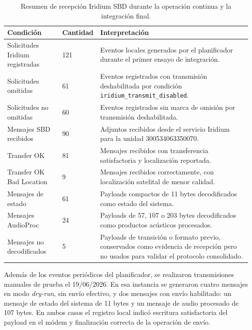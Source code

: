 \begin{table}[htpb]
\centering
\small
\caption{Resumen de recepción Iridium SBD durante la operación continua y la integración final.}
\label{tab:resumen_iridium_larga_duracion}

\begin{tabularx}{\textwidth}{p{} p{} X}
\toprule
\textbf{Condición} & \textbf{Cantidad} & \textbf{Interpretación} \\
\midrule
Solicitudes Iridium registradas & 121 & Eventos locales generados por el planificador durante el primer ensayo de integración. \\
Solicitudes omitidas & 61 & Eventos registrados con transmisión deshabilitada por condición \texttt{iridium\_transmit\_disabled}. \\
Solicitudes no omitidas & 60 & Eventos registrados sin marca de omisión por transmisión deshabilitada. \\
Mensajes SBD recibidos & 90 & Adjuntos recibidos desde el servicio Iridium para la unidad 300534063350070. \\
Transfer OK & 81 & Mensajes recibidos con transferencia satisfactoria y localización reportada. \\
Transfer OK Bad Location & 9 & Mensajes recibidos correctamente, con localización satelital de menor calidad. \\
Mensajes de estado & 61 & Payloads compactos de 11 bytes decodificados como estado del sistema. \\
Mensajes AudioProc & 24 & Payloads de 57, 107 o 203 bytes decodificados como productos acústicos procesados. \\
Mensajes no decodificados & 5 & Payloads de transición o formato previo, conservados como evidencia de recepción pero no usados para validar el protocolo consolidado. \\
\bottomrule
\end{tabularx}
\end{table}

Además de los eventos periódicos del planificador, se realizaron transmisiones manuales de prueba el 19/06/2026. En esa instancia se generaron cuatro mensajes en modo \textit{dry-run}, sin envío efectivo, y dos mensajes con envío habilitado: un mensaje de estado del sistema de 11 bytes y un mensaje de audio procesado de 107 bytes. En ambos casos el registro local indicó escritura satisfactoria del payload en el módem y finalización correcta de la operación de envío.

